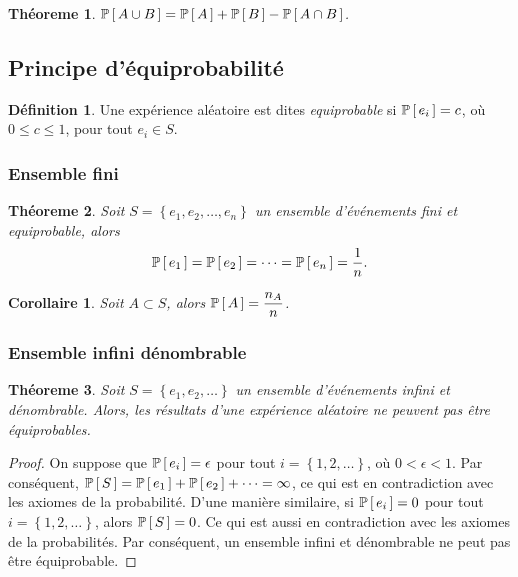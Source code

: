 \documentclass[11pt]{article}
\makeatletter
\renewcommand\P[1]{%
	\ensuremath{%
		\mathbb{P}\left[\,#1\,\right]%
	}%
}%
\newtheorem{theoreme}{Théoreme}[section]
\newtheorem*{corollary}{Corollaire}
\theoremstyle{remark}
\theoremstyle{definition}
\newtheorem*{@definition}{Définition}
\newenvironment{definition}{%
	\begin{@definition}%
}{%
	\end{@definition}%
	\setcounter{property}{0}%
}
\makeatother
\begin{document}
\begin{theoreme}
	$\P{A\cup B}=\P{A}+\P{B}-\P{A\cap B}$.
\end{theoreme}

\subsection{Principe d'équiprobabilité}
\begin{definition}
	Une expérience aléatoire est dites \textit{equiprobable} si $\P{e_i}=c$,
	où $0\leq c\leq 1$, pour tout $e_i\in S$.
\end{definition}

\subsubsection{Ensemble fini}
\begin{theoreme}
	Soit $S=\left\{e_1,e_2,\dots,e_n\right\}$ un ensemble d'événements fini
	et equiprobable, alors
	\begin{equation*}
		\P{e_1}=\P{e_2}=\cdots=\P{e_n}=\frac{1}{n}.
	\end{equation*}
\end{theoreme}

\begin{corollary}
	Soit $A\subset S$, alors $\P{A}=\dfrac{n_A}{n}$.
\end{corollary}

\subsubsection{Ensemble infini dénombrable}
\begin{theoreme}
	Soit $S=\left\{e_1,e_2,\dots\right\}$ un ensemble d'événements infini
	et dénombrable. Alors, les résultats d'une expérience aléatoire ne peuvent
	pas être équiprobables.
\end{theoreme}

\begin{proof}
	On suppose que $\P{e_i}=\epsilon$ pour tout $i=\left\{1,2,\dots\right\}$,
	où $0<\epsilon<1$. Par conséquent, $\P{S}=\P{e_1}+\P{e_2}+\cdots=\infty$,
	ce qui est en contradiction avec les axiomes de la probabilité. D'une
	manière similaire, si $\P{e_i}=0$ pour tout $i=\left\{1,2,\dots\right\}$,
	alors $\P{S}=0$. Ce qui est aussi en contradiction avec les axiomes de la
	probabilités. Par conséquent, un ensemble infini et dénombrable ne peut
	pas être équiprobable.
\end{proof}
\end{document}
